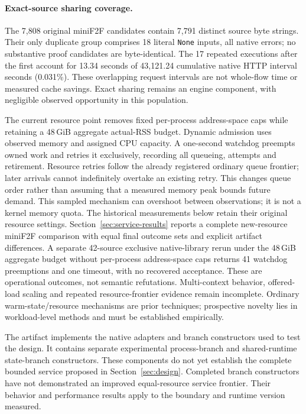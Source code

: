 \documentclass[10pt,twocolumn]{article}
\begin{document}
\paragraph{Exact-source sharing coverage.}
The 7,808 original miniF2F candidates contain 7,791 distinct source byte
strings. Their only duplicate group comprises 18 literal \texttt{None}
inputs, all native errors; no substantive proof candidates are byte-identical.
The 17 repeated executions after the first account for 13.34 seconds of
43,121.24 cumulative native HTTP interval seconds (0.031\%).
These overlapping request intervals are not whole-flow time or measured
cache savings. Exact sharing remains an engine component, with negligible
observed opportunity in this population.


The current resource point removes fixed per-process address-space caps
while retaining a 48\,GiB aggregate actual-RSS budget. Dynamic admission uses
observed memory and assigned CPU capacity. A one-second watchdog preempts
owned work and retries it exclusively, recording all queueing, attempts and
retirement. Resource retries follow the already registered ordinary queue
frontier; later arrivals cannot indefinitely overtake an existing retry.
This changes queue order rather than assuming that a measured memory peak
bounds future demand. This sampled mechanism can overshoot between observations; it is
not a kernel memory quota. The historical measurements below retain their
original resource settings. Section~\ref{sec:service-results} reports a complete
new-resource miniF2F comparison with equal final outcome sets and explicit
artifact differences. A separate 42-source exclusive native-library rerun
under the 48\,GiB aggregate budget without per-process address-space caps
returns 41 watchdog preemptions and one timeout, with no recovered acceptance.
These are operational outcomes, not semantic refutations. Multi-context
behavior, offered-load scaling and repeated resource-frontier evidence
remain incomplete.
Ordinary warm-state/resource mechanisms are prior techniques; prospective
novelty lies in workload-level methods and must be established empirically.

\label{sec:implementation}
The artifact implements the native adapters and branch constructors used to test the design. It contains separate experimental
process-branch and shared-runtime state-branch constructors. These components
do not yet establish the complete bounded service proposed in
Section~\ref{sec:design}. Completed branch constructors have not demonstrated
an improved equal-resource service frontier. Their behavior and performance
results apply to the boundary and runtime version measured.
\end{document}
